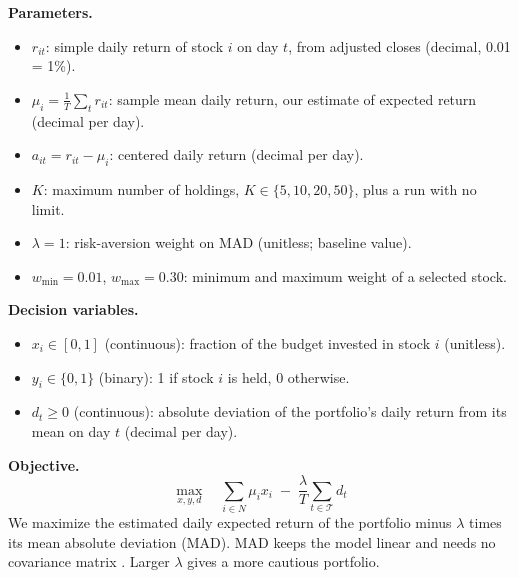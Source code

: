 \documentclass[11pt]{article}
\begin{document}
\textbf{Parameters.}
\begin{itemize}[leftmargin=*]
\item $r_{it}$: simple daily return of stock $i$ on day $t$, from adjusted closes (decimal, 0.01 = 1\%).
\item $\mu_i = \frac{1}{T}\sum_t r_{it}$: sample mean daily return, our estimate of expected return (decimal per day).
\item $a_{it} = r_{it}-\mu_i$: centered daily return (decimal per day).
\item $K$: maximum number of holdings, $K\in\{5,10,20,50\}$, plus a run with no limit.
\item $\lambda = 1$: risk-aversion weight on MAD (unitless; baseline value).
\item $w_{\min}=0.01$, $w_{\max}=0.30$: minimum and maximum weight of a selected stock.
\end{itemize}

\textbf{Decision variables.}
\begin{itemize}[leftmargin=*]
\item $x_i \in [0,1]$ (continuous): fraction of the budget invested in stock $i$ (unitless).
\item $y_i \in \{0,1\}$ (binary): 1 if stock $i$ is held, 0 otherwise.
\item $d_t \ge 0$ (continuous): absolute deviation of the portfolio's daily return from its mean on day $t$ (decimal per day).
\end{itemize}

\textbf{Objective.}
\[
\max_{x,y,d}\quad \sum_{i\in N}\mu_i x_i \;-\; \frac{\lambda}{T}\sum_{t\in\mathcal{T}} d_t
\]
We maximize the estimated daily expected return of the portfolio minus $\lambda$ times its mean absolute deviation (MAD). MAD keeps the model linear and needs no covariance matrix \cite{konno}. Larger $\lambda$ gives a more cautious portfolio.
\end{document}
